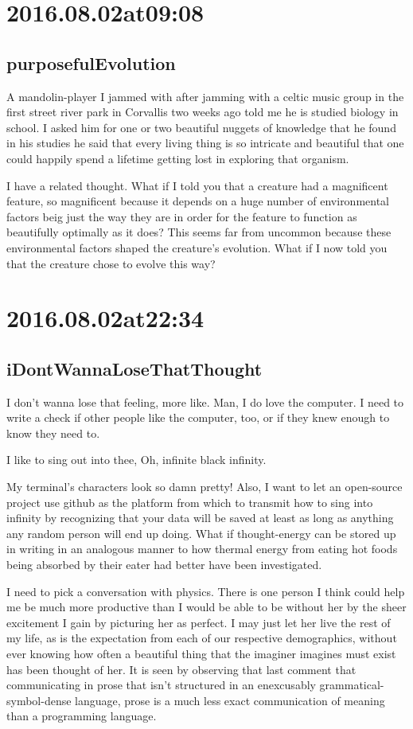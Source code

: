 \section*{ 2016.08.02at09:08 }
\subsection*{ purposefulEvolution }
A mandolin-player I jammed with after jamming with a celtic music group in the first street river park in Corvallis two weeks ago told me he is studied biology in school. I asked him for one or two beautiful nuggets of knowledge that he found in his studies he said that every living thing is so intricate and beautiful that one could happily spend a lifetime getting lost in exploring that organism.

I have a related thought. What if I told you that a creature had a magnificent feature, so magnificent because it depends on a huge number of environmental factors beig just the way they are in order for the feature to function as beautifully optimally as it does? This seems far from uncommon because these environmental factors shaped the creature's evolution. What if I now told you that the creature chose to evolve this way?

\section*{ 2016.08.02at22:34 }
\subsection*{ iDontWannaLoseThatThought }
I don't wanna lose that feeling, more like. Man, I do love the computer. I need to write a check if other people like the computer, too, or if they knew enough to know they need to. 

I like to sing out into thee,
Oh, infinite black infinity.

My terminal's characters look so damn pretty! Also, I want to let an open-source project use github as the platform from which to transmit how to sing into infinity by recognizing that your data will be saved at least as long as anything any random person will end up doing. What if thought-energy can be stored up in writing in an analogous manner to how thermal energy from eating hot foods being absorbed by their eater had better have been investigated.

I need to pick a conversation with physics. There is one person I think could help me be much more productive than I would be able to be without her by the sheer excitement I gain by picturing her as perfect. I may just let her live the rest of my life, as is the expectation from each of our respective demographics, without ever knowing how often a beautiful thing that the imaginer imagines must exist has been thought of her. It is seen by observing that last comment that communicating in prose that isn't structured in an enexcusably grammatical-symbol-dense language, prose is a much less exact communication of meaning than a programming language.

